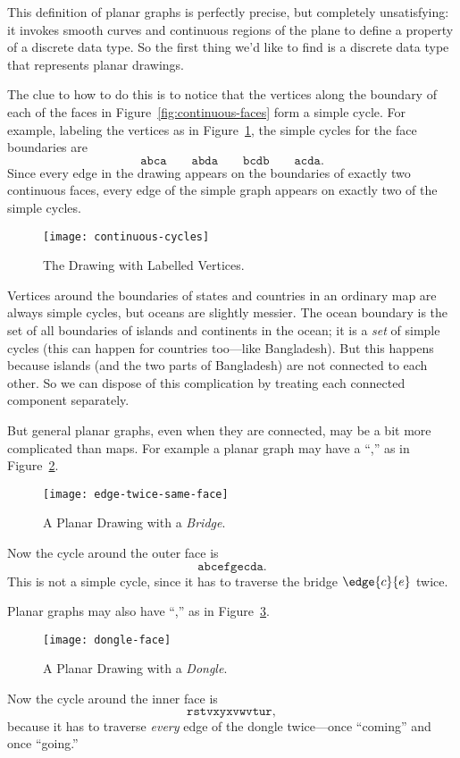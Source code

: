 This definition of planar graphs is perfectly precise, but completely
unsatisfying: it invokes smooth curves and continuous regions of the plane
to define a property of a discrete data type.  So the first thing we'd
like to find is a discrete data type that represents planar drawings.

The clue to how to do this is to notice that the vertices along the
boundary of each of the faces in Figure~\ref{fig:continuous-faces} form a
simple cycle.  For example, labeling the vertices as in
Figure~\ref{fig:continuous-cycles}, the simple cycles for the face
boundaries are
\[
\mathtt{abca}\qquad \mathtt{abda}\qquad \mathtt{bcdb}\qquad \mathtt{acda}.
\]
Since every edge in the drawing appears on the boundaries of exactly two
continuous faces, every edge of the simple graph appears on exactly two of
the simple cycles.

\begin{figure}
\texttt{[image: continuous-cycles]}
\caption{The Drawing with Labelled Vertices.}
\label{fig:continuous-cycles}
\end{figure}

Vertices around the boundaries of states and countries in an ordinary
map are always simple cycles, but oceans are slightly messier.  The
ocean boundary is the set of all boundaries of islands and continents
in the ocean; it is a \emph{set} of simple cycles (this can happen for
countries too---like Bangladesh).  But this happens because islands
(and the two parts of Bangladesh) are not connected to each other.  So
we can dispose of this complication by treating each connected
component separately.

But general planar graphs, even when they are connected, may be a bit more
complicated than maps.  For example a planar graph may have a
``,'' as in Figure~\ref{fig:bridge}.
\begin{figure}[h]
\texttt{[image: edge-twice-same-face]}
\caption{A Planar Drawing with a \emph{Bridge}.}
\label{fig:bridge}
\end{figure}
Now the cycle around the outer face is
\[
\mathtt{abcefgecda}.
\]
This is not a simple cycle, since it has to traverse the bridge
$\edge{c}{e}$ twice.

Planar graphs may also have ``,'' as in
Figure~\ref{fig:dongle}.
\begin{figure}[h]
\texttt{[image: dongle-face]}
\caption{A Planar Drawing with a \emph{Dongle}.}
\label{fig:dongle}
\end{figure}
Now the cycle around the inner face is
\[
\mathtt{rstvxyxvwvtur},
\]
because it has to traverse \emph{every} edge of the dongle
twice---once ``coming'' and once ``going.''

